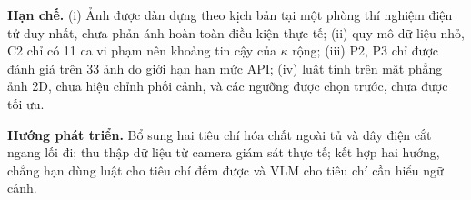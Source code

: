 \documentclass[conference]{IEEEtran}
\begin{document}
\textbf{Hạn chế.} (i) Ảnh được dàn dựng theo kịch bản tại một phòng thí nghiệm điện tử duy nhất, chưa phản ánh hoàn toàn điều kiện thực tế; (ii) quy mô dữ liệu nhỏ, C2 chỉ có 11 ca vi phạm nên khoảng tin cậy của $\kappa$ rộng; (iii) P2, P3 chỉ được đánh giá trên 33 ảnh do giới hạn hạn mức API; (iv) luật tính trên mặt phẳng ảnh 2D, chưa hiệu chỉnh phối cảnh, và các ngưỡng được chọn trước, chưa được tối ưu.

\textbf{Hướng phát triển.} Bổ sung hai tiêu chí hóa chất ngoài tủ và dây điện cắt ngang lối đi; thu thập dữ liệu từ camera giám sát thực tế; kết hợp hai hướng, chẳng hạn dùng luật cho tiêu chí đếm được và VLM cho tiêu chí cần hiểu ngữ cảnh.



\end{document}
